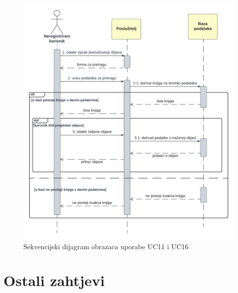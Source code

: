 				\begin{figure}[h]
					\centering
					\includegraphics[width = \textwidth]{slike/sekvUC16.PNG}
					\caption{Sekvencijski dijagram obrazaca uporabe UC11 i UC16}
					\label{fig:enter-label}
				\end{figure}
				\eject
	
	
		\section{Ostali zahtjevi}
		
